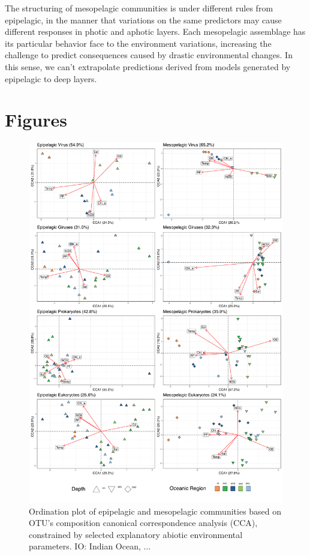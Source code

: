 \documentclass[fleqn,10pt]{wlscirep}
\begin{document}
The structuring of mesopelagic communities is under different rules from epipelagic, in the manner that variations on the same predictors may cause different responses in photic and aphotic layers. Each mesopelagic assemblage has its particular behavior face to the environment variations, increasing the challenge to predict consequences caused by drastic environmental changes. In this sense, we can’t extrapolate predictions derived from models generated by epipelagic to deep layers.
\newpage
\section*{Figures}

\begin{figure}[ht]
    \centering
    \includegraphics[scale=0.285]{images/custom_cca_plot_hellinger_no_bathy_labels_OS_regions_colors_to_print.pdf}
    \caption{Ordination plot of epipelagic and mesopelagic communities based on OTU’s composition canonical correspondence analysis (CCA), constrained by selected explanatory abiotic environmental parameters. IO: Indian Ocean, ...}
    \label{fig:cca_OS}
\end{figure}
\end{document}

